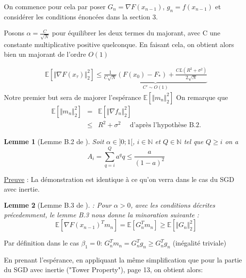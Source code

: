 \documentclass{article}
\newtheorem{lemma}{Lemme}
\begin{document}
\bigskip

On commence pour cela par poser $G_n=\nabla F(x_{n-1})$, $g_n=f(x_{n-1})$ et considérer les conditions énoncées dans la section 3.

 \bigskip

 Posons $\alpha=\frac{C}{\sqrt{N}}$ pour équilibrer les deux termes du majorant, avec C une constante multiplicative positive quelconque.
En faisant cela, on obtient alors bien un majorant de l'ordre $O(1)$

 \begin{eqnarray*}
\mathbb{E}[ \Vert \nabla F(x_\tau) \Vert ^2_2] \leq \underbrace{\frac{1}{C\sqrt{N}} (F(x_0)-F_*) + \frac{C L (R^2+ \sigma^2)}{2 \sqrt{N}}}_{C' \sim O(1)}
\end{eqnarray*}
Notre premier but sera de majorer l'espérance $\mathbb{E}[ \Vert m_n \Vert ^2_2]$
On remarque que 
\begin{eqnarray*}
    \mathbb{E}[ \Vert m_n \Vert ^2_2]&=&\mathbb{E}[ \Vert \nabla f_n \Vert ^2_2] \\
    &\leq&  R^2+ \sigma^2 \quad \textrm{ d'après l'hypothèse B.2.}
\end{eqnarray*}

\begin{lemma}[Lemme B.2 de \cite{defossez2022a}]
Soit $\alpha \in ]0;1[$, $i \in \mathbb{N}$ et $Q\in \mathbb{N}$ tel que $Q\geq i$ on a
\begin{equation}
A_i=\sum_{q=i}^{Q} a^q q \leq \frac{a}{(1-a)^2}
\end{equation}
\end{lemma}
 \noindent \underline{Preuve} : La démonstration est identique à ce qu'on verra dans le cas du SGD avec inertie.

\bigskip

\begin{lemma}[Lemme B.3 de \cite{defossez2022a}]: Pour $\alpha>0$, avec les conditions décrites précedemment, le lemme B.3 nous donne la minoration suivante :
\[
\mathbb{E}[\nabla F(x_{n-1})^T m_n]=\mathbb{E}[G_n^T m_n] \geq \mathbb{E}[ \Vert G_n \Vert ^2_2] \]
\end{lemma}

\bigskip

Par définition dans le cas $\beta_1=0$: $G_n^T m_n=G_n^T g_n \geq G_n^T g_n$ (inégalité triviale)
\
\bigskip

En prenant l'espérance, en appliquant la même simplification que pour la partie du SGD avec inertie ("Tower Property"), page 13, on obtient alors:
\end{document}

